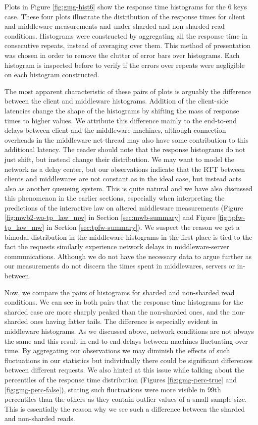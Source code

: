 \documentclass[11pt,a4paper]{article}
\begin{document}
Plots in Figure \ref{fig:gmg-hist6} show the response time histograms for the 6 keys case. These four plots illustrate the distribution of the response times for client and middleware measurements and under sharded and non-sharded read conditions. Histograms were constructed by aggregating all the response time in consecutive repeats, instead of averaging over them. This method of presentation was chosen in order to remove the clutter of error bars over histograms. Each histogram is inspected before to verify if the errors over repeats were negligible on each histogram constructed.
\par The most apparent characteristic of these pairs of plots is arguably the difference between the client and middleware histograms. Addition of the client-side latencies change the shape of the histograms by shifting the mass of response times to higher values. We attribute this difference mainly to the end-to-end delays between client and the middleware machines, although connection overheads in the middleware net-thread may also have some contribution to this additional latency. The reader should note that the response histograms do not just shift, but instead change their distribution. We may want to model the network as a delay center, but our observations indicate that the RTT between clients and middlewares are not constant as in the ideal case, but instead acts also as another queueing system. This is quite natural and we have also discussed this phenomenon in the earlier sections, especially when interpreting the predictions of the interactive law on altered middleware measurements (Figure \ref{fig:mwb2-wo-tp_law_mw} in Section \ref{sec:mwb-summary} and Figure \ref{fig:tpfw-tp_law_mw} in Section \ref{sec:tpfw-summary}). We suspect the reason we get a bimodal distribution in the middleware histograms in the first place is tied to the fact the requests similarly experience network delays in middleware-server communications. Although we do not have the necessary data to argue further as our measurements do not discern the times spent in middlewares, servers or in-between.
\\
\par Now, we compare the pairs of histograms for sharded and non-sharded read conditions. We can see in both pairs that the response time histograms for the sharded case are more sharply peaked than the non-sharded ones, and the non-sharded ones having fatter tails. The difference is especially evident in middleware histograms. As we discussed above, network conditions are not always the same and this result in end-to-end delays between machines fluctuating over time. By aggregating our observations we may diminish the effects of such fluctuations in our statistics but individually there could be significant differences between different requests. We also hinted at this issue while talking about the percentiles of the response time distribution (Figures \ref{fig:gmg-perc-true} and \ref{fig:gmg-perc-false}), stating such fluctuations were more visible in 99th percentiles than the others as they contain outlier values of a small sample size. This is essentially the reason why we see such a difference between the sharded and non-sharded reads.
\end{document}
